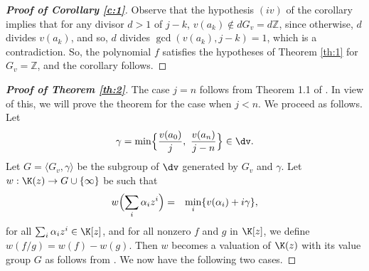 \documentclass[12pt]{amsart}%
\begin{document}
\begin{proof}[\bf Proof of Corollary \ref{c:1}]
Observe that the hypothesis $(iv)$ of the corollary implies that for any divisor $d>1$ of $j-k$, $v(a_k)\not\in dG_v=d\mathbb{Z}$, since otherwise, $d$ divides $v(a_k)$, and so, $d$ divides $\gcd(v(a_k),j-k)=1$, which is a contradiction. So, the polynomial $f$ satisfies the hypotheses of Theorem \ref{th:1} for $G_v=\mathbb{Z}$, and the corollary follows.
\end{proof}
\begin{proof}[\bf Proof of Theorem \ref{th:2}]
The case $j=n$ follows from Theorem 1.1 of \cite{AJ}. In view of this, we will prove the theorem for the case when $j<n$. We proceed as follows. Let
\begin{eqnarray*}
\gamma=\min\Bigl\{\frac{v(a_0)}{j},~\frac{v(a_n)}{j-n}\Bigr\}\in \dv.
\end{eqnarray*}
Let	$G=\langle G_v,\gamma\rangle$ be the subgroup of $\dv$ generated by $G_v$ and $\gamma$. Let $w:\K(z)\rightarrow G\cup\{\infty\}$ be such that
\begin{eqnarray*}
w\Bigl(\sum_{i}\alpha_i z^i\Bigr) &=& \min_i\{v(\alpha_i)+i\gamma\},
\end{eqnarray*}
for all $\sum_{i}\alpha_i z^i\in \K[z]$, and for all nonzero $f$ and $g$ in $\K[z]$, we define $w(f/g)=w(f)-w(g)$. Then $w$ becomes a valuation of $\K(z)$ with its value group $G$ as follows from \cite[Theorem 2.2]{EP}. We now have the following two cases.
	

\end{proof}
\end{document}
